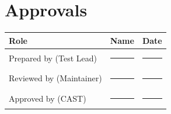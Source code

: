 \documentclass[12pt]{article}
\begin{document}
\section{Approvals}

\begin{center}
\begin{tabular}{p{5cm}p{5cm}p{3cm}}
  \toprule
  \textbf{Role} & \textbf{Name} & \textbf{Date} \\
  \midrule
  Prepared by (Test Lead)   & \rule{4.5cm}{0.4pt} & \rule{2.5cm}{0.4pt} \\[1.2em]
  Reviewed by (Maintainer)  & \rule{4.5cm}{0.4pt} & \rule{2.5cm}{0.4pt} \\[1.2em]
  Approved by (CAST)        & \rule{4.5cm}{0.4pt} & \rule{2.5cm}{0.4pt} \\
  \bottomrule
\end{tabular}
\end{center}
\end{document}
